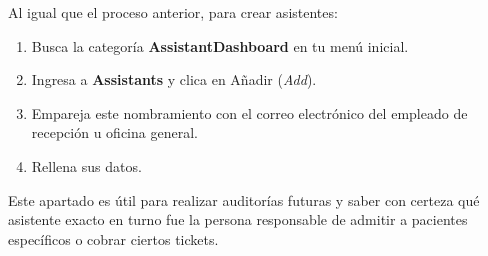 Al igual que el proceso anterior, para crear asistentes:
\begin{enumerate}
    \item Busca la categoría \textbf{AssistantDashboard} en tu menú inicial.
    \item Ingresa a \textbf{Assistants} y clica en Añadir (\textit{Add}).
    \item Empareja este nombramiento con el correo electrónico del empleado de recepción u oficina general.
    \item Rellena sus datos.
\end{enumerate}

Este apartado es útil para realizar auditorías futuras y saber con certeza qué asistente exacto en turno fue la persona responsable de admitir a pacientes específicos o cobrar ciertos tickets.
